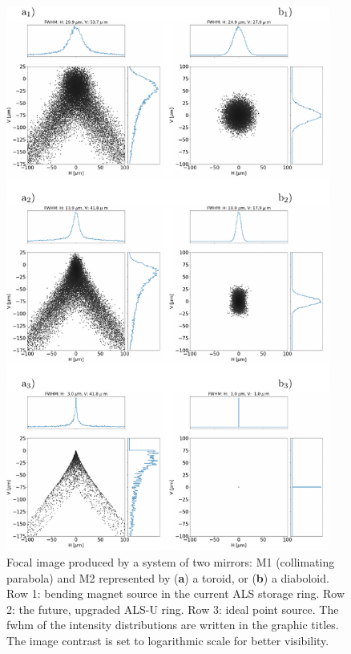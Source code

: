 \documentclass{iucr}       %
\begin{document}
\begin{figure}\label{fig:als}
\includegraphics[width=0.95\textwidth]{figures/fig4.pdf}
% 
% 
% 
% 
\caption{Focal image produced by a system of two mirrors: M1 (collimating parabola) and M2 represented by (\textbf{a}) a toroid, or (\textbf{b}) a diaboloid. Row 1: bending magnet source in the current ALS storage ring. Row 2: the future, upgraded ALS-U ring. Row 3: ideal point source. The fwhm of the intensity distributions are written in the graphic titles. The image contrast is set to logarithmic scale for better visibility.}
\end{figure}
\end{document}
